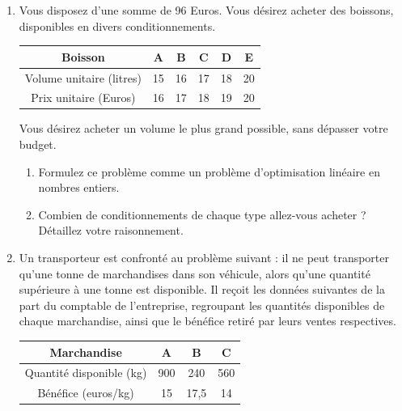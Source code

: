\begin{enumerate}
    \begin{solution}
    \end{solution}

  \item Vous disposez d'une somme de 96 Euros. Vous désirez acheter
    des boissons, disponibles en divers conditionnements.
    \begin{center}
      \begin{tabular}{|c|c|c|c|c|c|}
        \hline %
        Boisson & A & B & C & D & E\\
        \hline
        Volume unitaire (litres) & 15 & 16 & 17 & 18 & 20\\
        \hline
        Prix unitaire (Euros) & 16 & 17 & 18 & 19 & 20\\
        \hline
      \end{tabular}
    \end{center}
    Vous désirez acheter un volume le plus grand possible, sans
    dépasser votre budget.
    \begin{enumerate}
      \item Formulez ce problème comme un problème d'optimisation
        linéaire en nombres entiers.
      \item Combien de conditionnements de chaque type allez-vous acheter
        ? Détaillez votre raisonnement.
    \end{enumerate}

    \begin{solution}
    \end{solution}

  \item Un transporteur est confronté au problème suivant : il ne
    peut transporter qu'une tonne de marchandises dans son véhicule,
    alors qu'une quantité supérieure à une tonne est disponible. Il
    reçoit les données suivantes de la part du comptable de
    l'entreprise, regroupant les quantités disponibles de chaque
    marchandise, ainsi que le bénéfice retiré par leurs ventes
    respectives.

    \begin{center}
      \begin{tabular}{|c|c|c|c|}
        \hline %
        Marchandise & A & B & C\\
        \hline
        Quantité disponible (kg) & 900 & 240 & 560 \\
        \hline
        Bénéfice (euros/kg) & 15 & 17,5 & 14 \\
        \hline
      \end{tabular}
    \end{center}


\end{enumerate}
